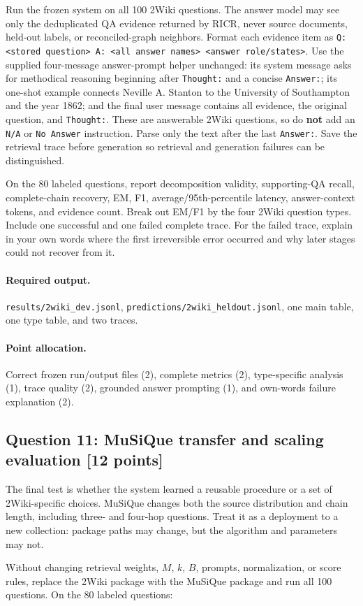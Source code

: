 \documentclass[11pt]{article}
\newcommand{\code}[1]{\texttt{#1}}
\newcommand{\RICR}{{\mdseries\textsc{RICR}}\xspace}
\newcommand{\question}[3]{%
  \subsection[Question #1: #2 (#3 points)]{Question #1: #2 \hfill [#3 points]}%
}
\newcommand{\deliverables}{\paragraph{Required output.}}
\newcommand{\grading}{\paragraph{Point allocation.}}
\begin{document}
Run the frozen system on all 100 2Wiki questions. The answer model may see only
the deduplicated QA evidence returned by \RICR, never source documents,
held-out labels, or reconciled-graph neighbors. Format each evidence item as
\code{Q: <stored question> A: <all answer names> <answer role/states>}. Use the
supplied four-message answer-prompt helper unchanged: its system message asks
for methodical reasoning beginning after \code{Thought:} and a concise
\code{Answer:}; its one-shot example connects Neville A. Stanton to the
University of Southampton and the year 1862; and the final user message
contains all evidence, the original question, and \code{Thought:}. These are
answerable 2Wiki questions, so do \textbf{not} add an \code{N/A} or
\code{No Answer} instruction. Parse only the text after the last
\code{Answer:}. Save the retrieval trace before generation so retrieval and
generation failures can be distinguished.

On the 80 labeled questions, report decomposition validity, supporting-QA
recall, complete-chain recovery, EM, F1, average/95th-percentile latency,
answer-context tokens, and evidence count. Break out EM/F1 by the four 2Wiki
question types. Include one successful and one failed complete trace. For the
failed trace, explain in your own words where the first irreversible error
occurred and why later stages could not recover from it.

\deliverables \code{results/2wiki\_dev.jsonl},
\code{predictions/2wiki\_heldout.jsonl}, one main table, one type table, and two
traces.

\grading Correct frozen run/output files (2), complete metrics (2),
type-specific analysis (1), trace quality (2), grounded answer prompting (1),
and own-words failure explanation (2).

\question{11}{MuSiQue transfer and scaling evaluation}{12}

The final test is whether the system learned a reusable procedure or a set of
2Wiki-specific choices. MuSiQue changes both the source distribution and chain
length, including three- and four-hop questions. Treat it as a deployment to a
new collection: package paths may change, but the algorithm and parameters may
not.

Without changing retrieval weights, $M$, $k$, $B$, prompts, normalization, or
score rules, replace the 2Wiki package with the MuSiQue package and run all 100
questions. On the 80 labeled questions:
\end{document}
